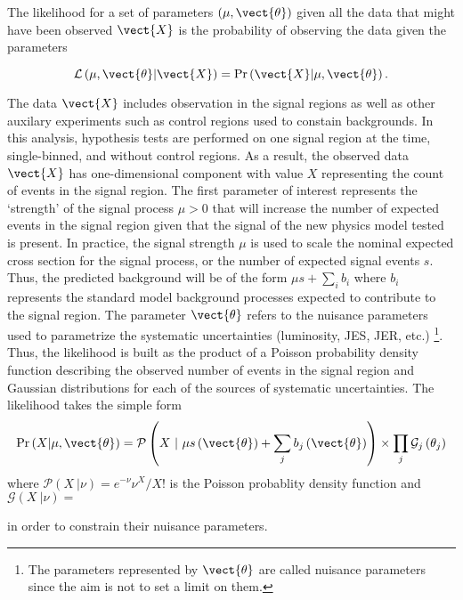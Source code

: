 The likelihood for a set of parameters $\left(\mu,  \vect{\theta}\right)$
given all the data that might have been observed  $\vect{X}$ is the probability 
of observing the data given the parameters

\begin{equation}
\mathcal{L} \left( \mu, \vect{\theta} \rvert \vect{X} \right) = 
\Pr\left(\vect{X} \rvert \mu, \vect{\theta} \right).
\end{equation}

The data $\vect{X}$ includes observation in the signal regions as well as 
other auxilary experiments such as control regions used to constain 
backgrounds. 
In this analysis, hypothesis tests are performed on one signal region 
at the time, single-binned, and without control regions. 
As a result, the observed data $\vect{X}$ has one-dimensional component 
with value $X$ representing the count of events in the signal region.
The first parameter of interest represents the `strength' of 
the signal process $\mu > 0$ that will increase the number of 
expected events in the signal region given that the signal of the new physics 
model tested is present. In practice, the signal strength $\mu$ is used to 
scale the nominal expected cross section for the signal process, or the
number of expected signal events $s$. 
Thus, the predicted background will be of the form $\mu s + \sum_i b_i$ where 
$b_i$ represents the standard model background processes expected to 
contribute to the signal region. 
The parameter $\vect{\theta}$ refers to 
the nuisance parameters used to parametrize the systematic uncertainties
(luminosity, JES, JER, etc.)
\footnote{The parameters represented by $\vect{\theta}$ are called nuisance 
parameters since the aim is not to set a limit on them.}.
Thus, the likelihood is built as the product of a Poisson probability density 
function describing the observed number of events in the signal 
region and Gaussian distributions for each of the sources of systematic 
uncertainties.
The likelihood takes the simple form
\begin{equation}
\Pr\left(X \rvert \mu, \vect{\theta} \right) = 
\mathcal{P} \left(X~\rvert~\mu s\left(\vect{\theta}\right)
+ \sum_j b_j\left(\vect{\theta}\right)\right)
\times  
\prod_{j}  \mathcal{G}_j \left(\theta_{j}\right)
\end{equation}
where $\mathcal{P} \left(X~\rvert \nu\right) = e^{-\nu}\nu^X/X!$ is 
the Poisson probablity density function and  
$\mathcal{G} \left(X~\rvert \nu\right)  = $


 in order to constrain their nuisance parameters.






